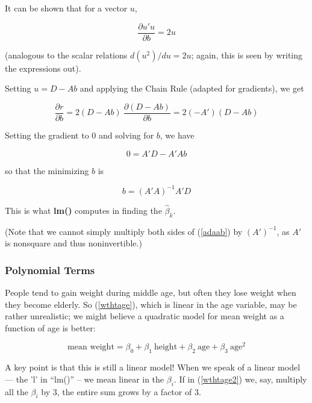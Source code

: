 It can be shown that for a vector $u$,

\begin{equation}
\frac{\partial u'u}{\partial b} = 2u
\end{equation}

(analogous to the scalar relations $d (u^2) /du = 2u$; again, this is
seen by writing the expressions out).

Setting $u = D - Ab$ and applying the Chain Rule (adapted for
gradients), we get

\begin{equation}
\frac{\partial r}{\partial b} = 
2(D - Ab) ~ \frac{\partial (D - Ab)}{\partial b}=
2 (-A') (D - Ab) 
\end{equation}

Setting the gradient to 0 and solving for $b$, we have

\begin{equation}
\label{adaab}
0 = A'D - A'Ab
\end{equation}

so that the minimizing $b$ is

\begin{equation}
\label{famouslm}
b = (A'A)^{-1} A'D
\end{equation}

This is what \textbf{lm()} computes in finding the $\widehat{\beta}_k$.

(Note that we cannot simply multiply both sides of (\ref{adaab}) by
$(A')^{-1}$, as $A'$ is nonsquare and thus noninvertible.)

\subsubsection{Polynomial Terms}
\label{poly}

People tend to gain weight during middle age, but often they lose weight
when they become elderly.  So (\ref{wthtage}), which is linear in the
age variable, may be rather unrealistic; we might believe a quadratic
model for mean weight as a function of age is better:

\begin{equation}
\label{wthtage2}
\textrm{mean weight} = \beta_0 + \beta_1 ~ \textrm{height} + 
\beta_2 ~ \textrm{age} +
\beta_3 ~ \textrm{age}^2
\end{equation}

A key point is that this is still a linear model! When we speak of a
linear model --- the 'l' in ``lm()'' -- we mean linear in the $\beta_i$.
If in (\ref{wthtage2}) we, say, multiply all the $\beta_i$ by 3, the
entire sum grows by a factor of 3.

